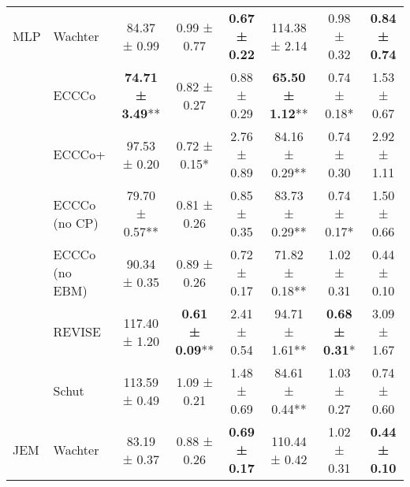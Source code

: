 \begin{table*}[t]
{\begin{tabular}[t]{llcccccc}
\multirow{-7}{*}{\raggedright\arraybackslash MLP} & Wachter & 84.37 ± 0.99\hphantom{*}\hphantom{*} & 0.99 ± 0.77\hphantom{*}\hphantom{*} & \textbf{0.67 ± 0.22}\hphantom{*}\hphantom{*} & 114.38 ± 2.14\hphantom{*}\hphantom{*} & 0.98 ± 0.32\hphantom{*}\hphantom{*} & \textbf{0.84 ± 0.74}\hphantom{*}\hphantom{*}\\
\cmidrule{1-8}
 & ECCCo & \textbf{74.71 ± 3.49}** & 0.82 ± 0.27\hphantom{*}\hphantom{*} & 0.88 ± 0.29\hphantom{*}\hphantom{*} & \textbf{65.50 ± 1.12}** & 0.74 ± 0.18*\hphantom{*} & 1.53 ± 0.67\hphantom{*}\hphantom{*}\\

 & ECCCo+ & 97.53 ± 0.20\hphantom{*}\hphantom{*} & 0.72 ± 0.15*\hphantom{*} & 2.76 ± 0.89\hphantom{*}\hphantom{*} & 84.16 ± 0.29** & 0.74 ± 0.30\hphantom{*}\hphantom{*} & 2.92 ± 1.11\hphantom{*}\hphantom{*}\\

 & ECCCo (no CP) & 79.70 ± 0.57** & 0.81 ± 0.26\hphantom{*}\hphantom{*} & 0.85 ± 0.35\hphantom{*}\hphantom{*} & 83.73 ± 0.29** & 0.74 ± 0.17*\hphantom{*} & 1.50 ± 0.66\hphantom{*}\hphantom{*}\\

 & ECCCo (no EBM) & 90.34 ± 0.35\hphantom{*}\hphantom{*} & 0.89 ± 0.26\hphantom{*}\hphantom{*} & 0.72 ± 0.17\hphantom{*}\hphantom{*} & 71.82 ± 0.18** & 1.02 ± 0.31\hphantom{*}\hphantom{*} & 0.44 ± 0.10\hphantom{*}\hphantom{*}\\

 & REVISE & 117.40 ± 1.20\hphantom{*}\hphantom{*} & \textbf{0.61 ± 0.09}** & 2.41 ± 0.54\hphantom{*}\hphantom{*} & 94.71 ± 1.61** & \textbf{0.68 ± 0.31}*\hphantom{*} & 3.09 ± 1.67\hphantom{*}\hphantom{*}\\

 & Schut & 113.59 ± 0.49\hphantom{*}\hphantom{*} & 1.09 ± 0.21\hphantom{*}\hphantom{*} & 1.48 ± 0.69\hphantom{*}\hphantom{*} & 84.61 ± 0.44** & 1.03 ± 0.27\hphantom{*}\hphantom{*} & 0.74 ± 0.60\hphantom{*}\hphantom{*}\\

\multirow{-7}{*}{\raggedright\arraybackslash JEM} & Wachter & 83.19 ± 0.37\hphantom{*}\hphantom{*} & 0.88 ± 0.26\hphantom{*}\hphantom{*} & \textbf{0.69 ± 0.17}\hphantom{*}\hphantom{*} & 110.44 ± 0.42\hphantom{*}\hphantom{*} & 1.02 ± 0.31\hphantom{*}\hphantom{*} & \textbf{0.44 ± 0.10}\hphantom{*}\hphantom{*}\\
\bottomrule
\end{tabular}}
\end{table*}
